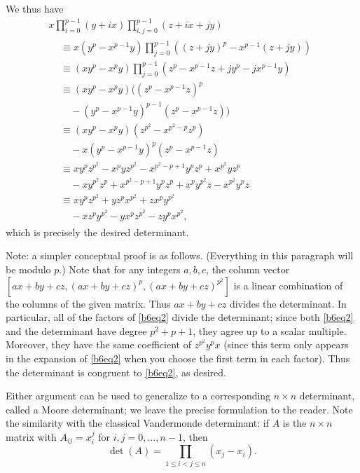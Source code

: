 \documentclass[amssymb,twocolumn,pra,10pt,aps]{revtex4-1}
\begin{document}
\begin{itemize}
We thus have
\begin{multline*}
x \prod_{i=0}^{p-1} (y+ix) \prod_{i,j=0}^{p-1} (z + ix + jy) \\
\begin{aligned}
&\equiv x (y^p - x^{p-1}y) \prod_{j=0}^{p-1} ((z+jy)^p - x^{p-1} (z+jy)) \\
&\equiv (xy^p - x^p y) \prod_{j=0}^{p-1} (z^p - x^{p-1} z + j y^p - j x^{p-1}
y) \\
&\equiv (xy^p - x^p y) ((z^p - x^{p-1} z)^p \\
&\quad - (y^p - x^{p-1}y)^{p-1}(z^p
- x^{p-1}z)) \\
 &\equiv (xy^p - x^p y)(z^{p^2} - x^{p^2 - p}z^p) \\
&\quad - x(y^p - x^{p-1}y)^p
(z^p - x^{p-1}z) \\
&\equiv xy^p z^{p^2} - x^p y z^{p^2} - x^{p^2-p+1} y^p z^p
+ x^{p^2} y z^p \\
&\quad - xy^{p^2}z^p + x^{p^2-p+1} y^p z^p
+ x^py^{p^2}z - x^{p^2} y^p z \\
&\equiv x y^p z^{p^2} + y z^p x^{p^2} + z x^p y^{p^2} \\
&\quad
- x z^p y^{p^2} - y x^p z^{p^2} - z y^p x^{p^2},
\end{aligned}
\end{multline*}
which is precisely the desired determinant.

Note: a simpler conceptual proof is as follows. (Everything in this
paragraph will be modulo $p$.) Note that for any
integers $a,b,c$, the column vector $[ax + by + cz, (ax + by + cz)^p,
(ax + by + cz)^{p^2}]$ is a linear combination of the columns of the
given matrix. Thus $ax+by+cz$ divides the determinant.
In particular, all of the factors of \eqref{b6eq2} divide the determinant;
since both \eqref{b6eq2} and the determinant have degree $p^2+p+1$,
they agree up to a scalar multiple. Moreover, they have the same
coefficient of $z^{p^2} y^p x$ (since this term only appears in
the expansion of \eqref{b6eq2} when you choose the first term in
each factor). Thus the determinant is congruent to \eqref{b6eq2}, as desired.

Either argument can be used to generalize to a corresponding $n \times n$
determinant, called a Moore determinant;
we leave the precise formulation to the reader. Note
the similarity with the classical Vandermonde determinant: if
$A$ is the $n \times n$ matrix with $A_{ij} = x_i^j$ for
$i,j=0, \dots, n-1$, then
\[
\det(A) = \prod_{1 \leq i < j \leq n} (x_j - x_i).
\]

\end{itemize}
\end{document}
